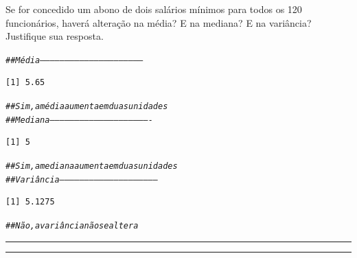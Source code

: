 \documentclass[a4paper,11pt,fleqn]{article}\usepackage[]{graphicx}\usepackage[]{color}
\makeatletter
\newcommand{\hlcom}[1]{\textcolor[rgb]{0.4,0.4,0.4}{\textit{#1}}}%
\newenvironment{kframe}{%
 \def\at@end@of@kframe{}%
 \ifinner\ifhmode%
  \def\at@end@of@kframe{\end{minipage}}%
  \begin{minipage}{\columnwidth}%
 \fi\fi%
 \def\FrameCommand##1{\hskip\@totalleftmargin \hskip-\fboxsep
 \colorbox{shadecolor}{##1}\hskip-\fboxsep
     \hskip-\linewidth \hskip-\@totalleftmargin \hskip\columnwidth}%
 \MakeFramed {\advance\hsize-\width
   \@totalleftmargin\z@ \linewidth\hsize
   \@setminipage}}%
 {\par\unskip\endMakeFramed%
 \at@end@of@kframe}
\newenvironment{knitrout}{}{} %
\theoremstyle{definition}
\makeatother
\begin{document}
\begin{compactenum}[8.]
\begin{compactenum}
\begin{knitrout}
\begin{kframe}
\end{kframe}
\end{knitrout}
\item Se for concedido um abono de dois salários mínimos para todos os
  120 funcionários, haverá alteração na média? E na mediana? E na
  variância? Justifique sua resposta.
\begin{knitrout}\small
{}\color{fgcolor}\begin{kframe}
\begin{alltt}
\hlcom{## Média ---------------------------------------------------------------}
\end{alltt}
\begin{verbatim}
[1] 5.65
\end{verbatim}
\begin{alltt}
\hlcom{## Sim, a média aumenta em duas unidades}
\hlcom{## Mediana -------------------------------------------------------------}
\end{alltt}
\begin{verbatim}
[1] 5
\end{verbatim}
\begin{alltt}
\hlcom{## Sim, a mediana aumenta em duas unidades}
\hlcom{## Variância -----------------------------------------------------------}
\end{alltt}
\begin{verbatim}
[1] 5.1275
\end{verbatim}
\begin{alltt}
\hlcom{## Não, a variância não se altera}
\end{alltt}
\end{kframe}
\end{knitrout}
\end{compactenum}
\end{compactenum}

\vspace{0.3cm}
\hrule
\vspace{0.3cm}

\clearpage

\vspace{0.3cm}
\hrule
\vspace{0.3cm}
\end{document}
